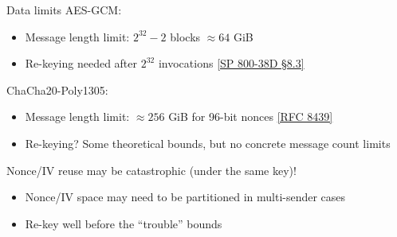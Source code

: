 \begin{frame}{Data limits}
  AES-GCM:
  \begin{itemize}[<+(1)->]
    \item Message length limit: $2^{32} - 2$ blocks $\approx 64$ GiB
    \item Re-keying needed after $2^{32}$ invocations \href{https://csrc.nist.gov/pubs/sp/800/38/d/final}{[SP 800-38D \S 8.3]}
  \end{itemize}

  \vspace*{0.5em}

  \pause
  ChaCha20-Poly1305:
  \begin{itemize}[<+(1)->]
    \item Message length limit: $\approx 256$ GiB for 96-bit nonces \href{https://datatracker.ietf.org/doc/html/rfc8439\#section-2.8}{[RFC 8439]}
    \item Re-keying? Some theoretical bounds, but no concrete message count limits
  \end{itemize}

  \vspace*{0.5em}

  \pause
  Nonce/IV reuse may be catastrophic (under the same key)!
  \begin{itemize}[<+(1)->]
    \item Nonce/IV space may need to be partitioned in multi-sender cases
    \item Re-key well before the \enquote{trouble} bounds
  \end{itemize}
\end{frame}


